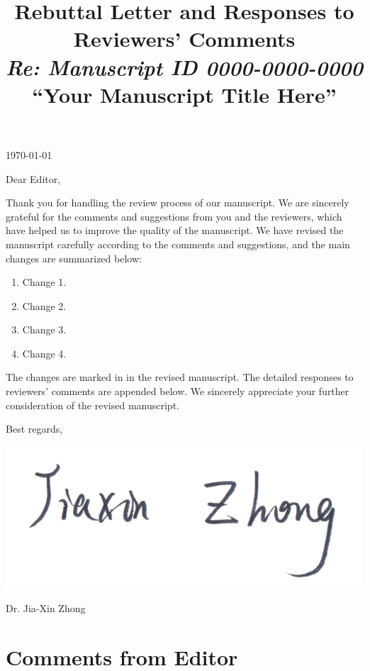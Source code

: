 \documentclass{RebuttalLetter}
\title{
    \vspace{2em}
    \textbf{\Large Rebuttal Letter and Responses to Reviewers' Comments}
    \\[-.5em]
    \textit{\large Re: Manuscript ID 0000-0000-0000}
    \\[-.5em]
    \textbf{\large ``Your Manuscript Title Here''}
    \vspace{-4em}
}
\begin{document}
\date{}
\maketitle

\thispagestyle{firststyle}

\noindent
\today

\noindent
Dear Editor,

Thank you for handling the review process of our manuscript.
We are sincerely grateful for the comments and suggestions from you and the reviewers, which have helped us
to improve the quality of the manuscript. We have revised the manuscript carefully according to
the comments and suggestions, and the main changes are summarized below:
\begin{enumerate}
    \item Change 1.
    \item Change 2.
    \item Change 3.
    \item Change 4.
\end{enumerate}

The changes are marked in  in the revised manuscript.
The detailed responses to reviewers' comments are appended below.
We sincerely appreciate your further consideration of the revised manuscript.


\lipsum[1-4]

Best regards,

\includegraphics[scale=0.8]{img/Signature-EN1-20181030.png}
\vspace{-1em}

Dr. Jia-Xin Zhong

\newpage
\section{Comments from Editor}
\begin{commentbox}
    \lipsum[1]
\end{commentbox}
\end{document}

